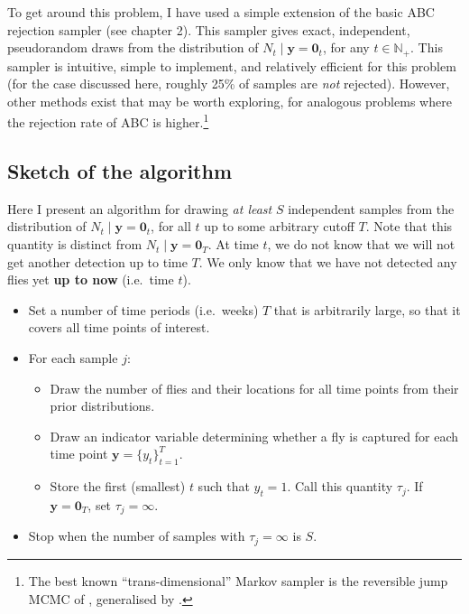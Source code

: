 \documentclass[
  oneside]{book}
\providecommand{\tightlist}{%
  \setlength{\itemsep}{0pt}\setlength{\parskip}{0pt}}
\begin{document}
To get around this problem, I have used a simple extension of the basic ABC rejection sampler (see chapter 2). This sampler gives exact, independent, pseudorandom draws from the distribution of \(N_t \mid \mathbf y = \mathbf 0_t\), for any \(t \in \mathbb N_+\). This sampler is intuitive, simple to implement, and relatively efficient for this problem (for the case discussed here, roughly 25\% of samples are \emph{not} rejected). However, other methods exist that may be worth exploring, for analogous problems where the rejection rate of ABC is higher.\footnote{The best known ``trans-dimensional'' Markov sampler is the reversible jump MCMC of \citet{green1995}, generalised by \citet{keith2004}.}

\hypertarget{sketch-of-the-algorithm}{%
\subsection{Sketch of the algorithm}\label{sketch-of-the-algorithm}}

Here I present an algorithm for drawing \emph{at least} \(S\) independent samples from the distribution of \(N_t \mid \mathbf y = \mathbf 0_t\), for all \(t\) up to some arbitrary cutoff \(T\). Note that this quantity is distinct from \(N_t \mid \mathbf y = \mathbf 0_T\). At time \(t\), we do not know that we will not get another detection up to time \(T\). We only know that we have not detected any flies yet \textbf{up to now} (i.e.~time \(t\)).

\begin{itemize}
\tightlist
\item
  Set a number of time periods (i.e.~weeks) \(T\) that is arbitrarily large, so that it covers all time points of interest.
\item
  For each sample \(j\):

  \begin{itemize}
  \tightlist
  \item
    Draw the number of flies and their locations for all time points from their prior distributions.
  \item
    Draw an indicator variable determining whether a fly is captured for each time point \(\mathbf y = \{y_t\}_{t=1}^T\).
  \item
    Store the first (smallest) \(t\) such that \(y_t = 1\). Call this quantity \(\tau_j\). If \(\mathbf y = \mathbf 0_T\), set \(\tau_j = \infty\).
  \end{itemize}
\item
  Stop when the number of samples with \(\tau_j = \infty\) is \(S\).
\end{itemize}
\end{document}
